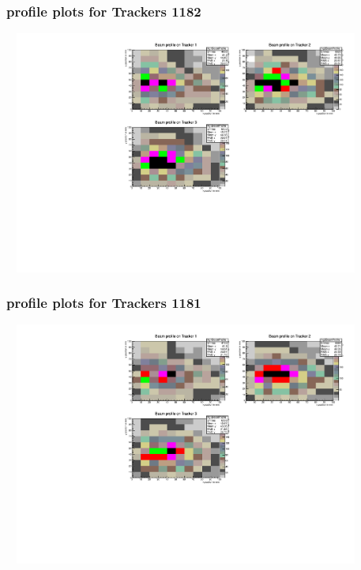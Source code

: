 \documentclass[slidestop,compress,mathserif]{beamer}
\begin{document}
\begin{frame}\frametitle{profile plots for Trackers 1182}
	 \includegraphics[width=12cm,height=8cm]{profile_plots_for_Trackers_1182.pdf}
\end{frame}
\begin{frame}\frametitle{profile plots for Trackers 1181}
	 \includegraphics[width=12cm,height=8cm]{profile_plots_for_Trackers_1181.pdf}
\end{frame}
\end{document}
